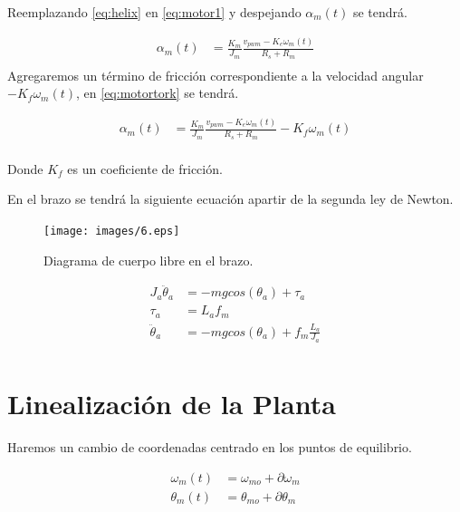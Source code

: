 \documentclass[a4paper]{IEEEtran} %
\begin{document}
Reemplazando \ref{eq:helix} en \ref{eq:motor1} y despejando $\alpha_{m}(t)$ se tendrá.

\begin{equation}
    \begin{split}
        \alpha_{m}(t)&=\frac{K_{m}}{J_{m}}\frac{v_{pwm}-K_{e}\omega_{m}(t)}{R_{s}+R_{m}}\\
    \end{split}
    \label{eq:motortork}
\end{equation}
Agregaremos un término de fricción correspondiente a la velocidad angular $-K_{f}\omega_{m}(t)$, en \ref{eq:motortork} se tendrá.

\begin{equation}
    \begin{split}
        \alpha_{m}(t)&=\frac{K_{m}}{J_{m}}\frac{v_{pwm}-K_{e}\omega_{m}(t)}{R_{s}+R_{m}}-K_{f}\omega_{m}(t)\\
    \end{split}
    \label{eq:motortork1}
\end{equation}

Donde $K_{f}$ es un coeficiente de fricción.
\vspace{5mm}

En el brazo se tendrá la siguiente ecuación apartir de la segunda ley de Newton.

\begin{figure}[h]
    \centering
        \texttt{[image: images/6.eps]}
        \caption{Diagrama de cuerpo libre en el brazo.}
        \label{fig:DLC}
\end{figure}

\begin{equation}
    \begin{split}
        J_{a}\ddot{\theta}_{a}&=-mgcos(\theta_{a})+\tau_{a}\\
        \tau_{a}&=L_{a}f_{m}\\
        \ddot{\theta}_{a}&=-mgcos(\theta_{a})+f_{m}\frac{L_{a}}{J_{a}}\\
    \end{split}
    \label{eq:laplas}
\end{equation}

\section{Linealización de la Planta}

Haremos un cambio de coordenadas centrado en los puntos de equilibrio.

\begin{equation}
    \begin{split}
        \omega_{m}(t)&=\omega_{mo}+\partial\omega_{m}\\
        \theta_{m}(t)&=\theta_{mo}+\partial\theta_{m}\\
    \end{split}
    \label{eq:torkbrazo}
\end{equation}
\end{document}
